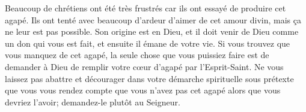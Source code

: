Beaucoup de chrétiens ont été très frustrés car ils ont essayé
 de produire cet agapé.
 Ils ont tenté avec beaucoup d'ardeur d'aimer de cet amour divin,
 mais ça ne leur est pas possible. Son origine est en Dieu,
 et il doit venir de Dieu comme un don qui vous est fait,
 et ensuite il émane de votre vie. Si vous trouvez que vous manquez
 de cet agapé, la seule chose que vous puissiez faire est de demander à Dieu
 de remplir votre cœur d'agapé par l'Esprit-Saint.
 Ne vous laissez pas abattre et décourager
 dans votre démarche spirituelle
 sous prétexte que vous vous rendez compte que vous n'avez pas
 cet agapé alors que vous devriez l'avoir;
 demandez-le plutôt au Seigneur.
\closechapter

